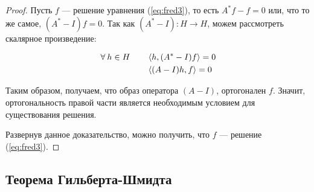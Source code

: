 \documentclass[12pt]{article}
\begin{document}
		\begin{proof}
			Пусть $f$ --- решение уравнения (\ref{eq:fred3}), то есть $A^*f - f = 0$ или, что то же самое, 
			$(A^* - I)f = 0$. Так как $(A^* - I): H \rightarrow H$, можем рассмотреть скалярное произведение:
		
			\begin{align*}
				\forall h \in H \qquad &\scal{h}{(A^*-I)f} = 0 \\
					                   &\scal{(A-I)h}{f} = 0
			\end{align*}
		
			Таким образом, получаем, что образ оператора $(A-I)$, ортогонален $f$. Значит, ортогональность 
			правой части является необходимым условием для существования решения.
		
			Развернув данное доказательство, можно получить, что $f$ --- решение (\ref{eq:fred3}).
		\end{proof}
	
	\subsection{Теорема Гильберта-Шмидта}
\end{document}
